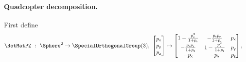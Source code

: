 \paragraph*{Quadcopter decomposition.}
First define
\begin{align}
 \RotMatPZ \ &: \ \Sphere^2 \rightarrow \SpecialOrthogonalGroup(3), \ 
 \begin{bmatrix} p_\mathsf{x} \\ p_\mathsf{y} \\ p_\mathsf{z} \end{bmatrix}
 \mapsto
 \begin{bmatrix}
  1 - \frac{p_\mathsf{x}^2}{1+p_\mathsf{z}} & -\frac{p_\mathsf{x} p_\mathsf{y}}{1+p_\mathsf{z}} & p_\mathsf{x} \\
  -\frac{p_\mathsf{x} p_\mathsf{y}}{1+p_\mathsf{z}} & 1 - \frac{p_\mathsf{y}^2}{1+p_\mathsf{z}} & p_\mathsf{y} \\
  -p_\mathsf{x} & -p_\mathsf{y} & p_\mathsf{z}
 \end{bmatrix},
\end{align} 

